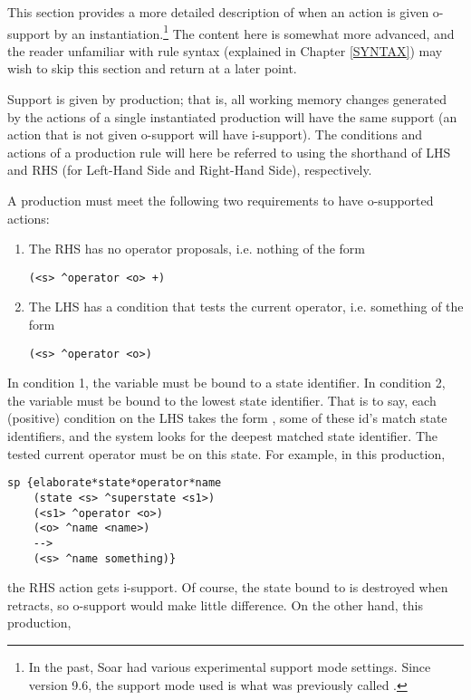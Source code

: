 This section provides a more detailed description of when an action is given o-support by an instantiation.\footnote{In the past, Soar had various experimental support mode settings. Since version 9.6, the support mode used is what was previously called .} The content here is somewhat more advanced, and the reader unfamiliar with rule syntax (explained in Chapter \ref{SYNTAX}) may wish to skip this section and return at a later point.

Support is given by production; that is, all working memory changes generated by the actions of a single instantiated production will have the same support (an action that is not given o-support will have i-support). The conditions and actions of a production rule will here be referred to using the shorthand of LHS and RHS (for Left-Hand Side and Right-Hand Side), respectively.

A production must meet the following two requirements to have o-supported actions:
\begin{enumerate}
	\item The RHS has no operator proposals, i.e. nothing of the form \begin{verbatim}(<s> ^operator <o> +) \end{verbatim}
	\item The LHS has a condition that tests the current operator, i.e. something of the form
	\begin{verbatim}(<s> ^operator <o>)\end{verbatim}
\end{enumerate}

In condition 1, the variable  must be bound to a state identifier.
In condition 2, the variable  must be bound to the lowest state identifier. That is to say, each (positive) condition on the LHS takes the form , some of these id's match state identifiers, and the system looks for the deepest matched state identifier. The tested current operator must be on this state. For example, in this production,

\begin{verbatim}
sp {elaborate*state*operator*name
    (state <s> ^superstate <s1>)
    (<s1> ^operator <o>)
    (<o> ^name <name>)
    -->
    (<s> ^name something)}
\end{verbatim}


the RHS action gets i-support. Of course, the state bound to  is destroyed when  retracts, so o-support would make little difference. On the other hand, this production,

